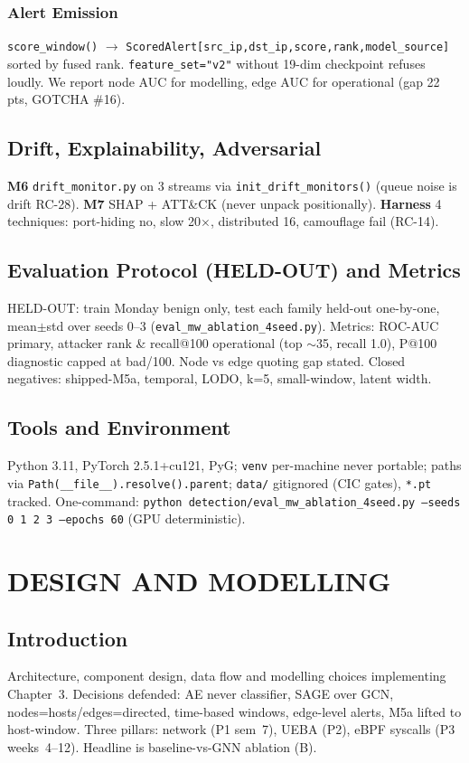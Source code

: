 \documentclass[12pt,a4paper,oneside]{report}
\begin{document}
\subsection{Alert Emission}
\texttt{score\_window()} $\rightarrow$ \texttt{ScoredAlert[src\_ip,dst\_ip,score,rank,model\_source]} sorted by fused rank. \texttt{feature\_set="v2"} without 19-dim checkpoint refuses loudly. We report node AUC for modelling, edge AUC for operational (gap 22 pts, GOTCHA \#16).

\section{Drift, Explainability, Adversarial}
\textbf{M6} \texttt{drift\_monitor.py} on 3 streams via \texttt{init\_drift\_monitors()} (queue noise is drift RC-28). \textbf{M7} SHAP + ATT\&CK (never unpack positionally). \textbf{Harness} 4 techniques: port-hiding no, slow 20$\times$, distributed 16, camouflage fail (RC-14).

\section{Evaluation Protocol (HELD-OUT) and Metrics}
HELD-OUT: train Monday benign only, test each family held-out one-by-one, mean$\pm$std over seeds 0--3 (\texttt{eval\_mw\_ablation\_4seed.py}). Metrics: ROC-AUC primary, attacker rank \& recall@100 operational (top $\sim$35, recall 1.0), P@100 diagnostic capped at bad/100. Node vs edge quoting gap stated. Closed negatives: shipped-M5a, temporal, LODO, k=5, small-window, latent width.

\section{Tools and Environment}
Python 3.11, PyTorch 2.5.1+cu121, PyG; \texttt{venv} per-machine never portable; paths via \texttt{Path(\_\_file\_\_).resolve().parent}; \texttt{data/} gitignored (CIC gates), \texttt{*.pt} tracked. One-command: \texttt{python detection/eval\_mw\_ablation\_4seed.py --seeds 0 1 2 3 --epochs 60} (GPU deterministic).

\chapter{DESIGN AND MODELLING}
\label{ch:design}

\section{Introduction}
Architecture, component design, data flow and modelling choices implementing Chapter~3. Decisions defended: AE never classifier, SAGE over GCN, nodes=hosts/edges=directed, time-based windows, edge-level alerts, M5a lifted to host-window. Three pillars: network (P1 sem~7), UEBA (P2), eBPF syscalls (P3 weeks~4--12). Headline is baseline-vs-GNN ablation (B).
\end{document}
